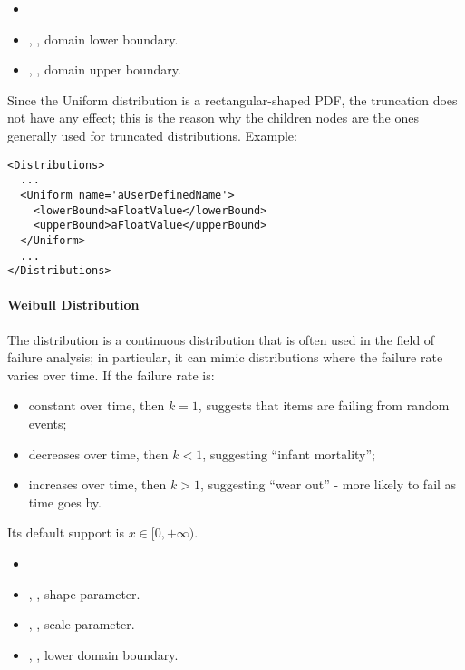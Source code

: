 %
\attrIntro
\vspace{-5mm}
\begin{itemize}
  \itemsep0em
  \item \nameDescription
\end{itemize}
\vspace{-5mm}
\subnodesIntro
\begin{itemize}
  \item {}, , domain lower
  boundary.
  \item {}, , domain upper
  boundary.
\end{itemize}
\nb Since the Uniform distribution is a rectangular-shaped PDF, the truncation does not have any effect;
 this is the reason why the children nodes are the ones generally used for truncated distributions.
Example:
\begin{lstlisting}[style=XML]
<Distributions>
  ...
  <Uniform name='aUserDefinedName'>
    <lowerBound>aFloatValue</lowerBound>
    <upperBound>aFloatValue</upperBound>
  </Uniform>
  ...
</Distributions>
\end{lstlisting}

\paragraph{Weibull Distribution}
\label{Weibull}
The  distribution is a continuous distribution that is often
used in the field of failure analysis; in particular, it can mimic distributions
where the failure rate varies over time.
%
If the failure rate is:
\vspace{-5mm}
\begin{itemize}
  \itemsep0em
  \item constant over time, then $k = 1$, suggests that items are failing from
  random events;
  \item decreases over time, then $k < 1$, suggesting ``infant mortality'';
  \item increases over time, then $k > 1$, suggesting ``wear out'' - more likely
  to fail as time goes by.
\end{itemize}
\vspace{-5mm}
Its default support is $x \in [0, +\infty)$.

%
\attrIntro
\vspace{-5mm}
\begin{itemize}
  \itemsep0em
  \item \nameDescription
\end{itemize}
\vspace{-5mm}
\subnodesIntro
\begin{itemize}
  \item {}, , shape parameter.
  \item {}, , scale parameter.
  \item {}, , lower domain
  boundary. 
\end{itemize}

